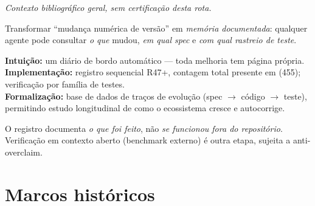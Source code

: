\noindent\textit{Contexto bibliográfico geral, sem certificação desta rota.} 


\begin{funcao}
Transformar ``mudança numérica de versão'' em \emph{memória documentada}: qualquer
agente pode consultar \emph{o que} mudou, \emph{em qual spec} e \emph{com qual
rastreio de teste}.
\end{funcao}

\begin{niveis}
\textbf{Intuição:} um diário de bordo automático — toda melhoria tem página própria.\\
\textbf{Implementação:} registro sequencial R47+, contagem total presente em
 (455); verificação por família de testes.\\
\textbf{Formalização:} base de dados de traços de evolução (spec $\to$ código $\to$ teste),
permitindo estudo longitudinal de como o ecossistema cresce e autocorrige.
\end{niveis}

\begin{limite}
O registro documenta \emph{o que foi feito}, não \emph{se funcionou fora do
repositório}. Verificação em contexto aberto (benchmark externo) é outra etapa,
sujeita a anti-overclaim.
\end{limite}

\clearpage
\section{Marcos históricos}


